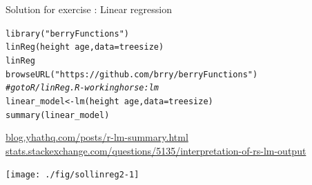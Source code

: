 \documentclass[xcolor=table,           xcolor=dvipsnames]{beamer}\usepackage[]{graphicx}\usepackage[]{color}
\makeatletter
\newcommand{\hlstr}[1]{\textcolor[rgb]{0.545,0.137,0.137}{#1}}
\newcommand{\hlcom}[1]{\textcolor[rgb]{0,0.392,0}{\textit{#1}}}
\newcommand{\hlopt}[1]{\textcolor[rgb]{0,0,0}{#1}}
\newcommand{\hlstd}[1]{\textcolor[rgb]{0,0,0}{#1}}
\newcommand{\hlkwb}[1]{\textcolor[rgb]{0,0,0}{#1}}
\newcommand{\hlkwc}[1]{\textcolor[rgb]{1,0,1}{#1}}
\newcommand{\hlkwd}[1]{\textcolor[rgb]{0,0,1}{#1}}
\newenvironment{kframe}{%
 \def\at@end@of@kframe{}%
 \ifinner\ifhmode%
  \def\at@end@of@kframe{\end{minipage}}%
  \begin{minipage}{\columnwidth}%
 \fi\fi%
 \def\FrameCommand##1{\hskip\@totalleftmargin \hskip-\fboxsep
 \colorbox{shadecolor}{##1}\hskip-\fboxsep
     \hskip-\linewidth \hskip-\@totalleftmargin \hskip\columnwidth}%
 \MakeFramed {\advance\hsize-\width
   \@totalleftmargin\z@ \linewidth\hsize
   \@setminipage}}%
 {\par\unskip\endMakeFramed%
 \at@end@of@kframe}
\newenvironment{knitrout}{}{} %
\newcounter{exercisecount}
\makeatother
\begin{document}

\begin{frame}[fragile]{Solution for exercise : Linear regression}
\vspace{-1em}
\begin{knitrout}\footnotesize
{}\color{fgcolor}\begin{kframe}
\begin{alltt}
\hlkwd{library}\hlstd{(}\hlstr{"berryFunctions"}\hlstd{)}
\hlkwd{linReg}\hlstd{(height}\hlopt{~}\hlstd{age,} \hlkwc{data}\hlstd{=treesize)}
\hlstd{linReg}
\hlkwd{browseURL}\hlstd{(}\hlstr{"https://github.com/brry/berryFunctions"}\hlstd{)}
\hlcom{# go to R/linReg.R  -  working horse: lm}
\hlstd{linear_model} \hlkwb{<-} \hlkwd{lm}\hlstd{(height}\hlopt{~}\hlstd{age,} \hlkwc{data}\hlstd{=treesize)}
\hlkwd{summary}\hlstd{(linear_model)}
\end{alltt}
\end{kframe}
\end{knitrout}
\vspace{-1em}
\small
\href{http://blog.yhathq.com/posts/r-lm-summary.html}{blog.yhathq.com/posts/r-lm-summary.html}\\
\href{http://stats.stackexchange.com/questions/5135/interpretation-of-rs-lm-output}{stats.stackexchange.com/questions/5135/interpretation-of-rs-lm-output}
\normalsize
\begin{knitrout}
\color{fgcolor}

{\centering \texttt{[image: ./fig/sollinreg2-1]} 

}



\end{knitrout}
\end{frame}
\end{document}
